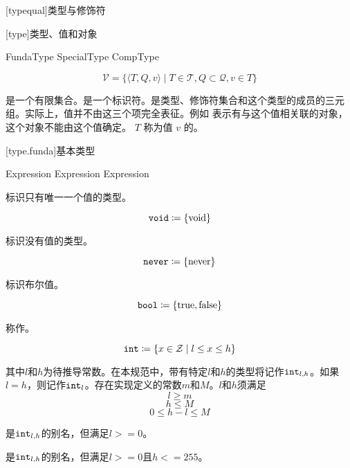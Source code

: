 
[typequal]{类型与修饰符}

[type]{类型、值和对象}

\begin{bnf}
 \br
    FundaType \br
    SpecialType \br
    CompType
\end{bnf}

$$ \mathcal{V} = \{ \langle T, Q, v \rangle \mid T \in \mathcal{T}, Q \subset \mathcal{Q}, v \in T \} $$

\pnum
{}是一个有限集合。是一个标识符。是类型、修饰符集合和这个类型的成员的三元组。\enternote 实际上，值并不由这三个项完全表征。例如  表示有与这个值相关联的对象，这个对象不能由这个值确定。 \exitnote $T$ 称为值 $v$ 的。

[type.funda]{基本类型}

\begin{bnf}
 \br
     \br
     \br
     \br
     \br
     \br
     \terminal{<} Expression \terminal{,} Expression \terminal{>} \br
     \br
     \terminal{<} Expression \terminal{>} \br
\end{bnf}

\pnum
{}标识只有唯一一个值的类型。

$$\texttt{void} \coloneqq \{ \mathrm{void} \}$$

\pnum
{}标识没有值的类型。

$$\texttt{never} \coloneqq \{ \mathrm{never} \}$$

\pnum
{} 标识布尔值。

$$\texttt{bool} \coloneqq \{ \mathrm{true}, \mathrm{false} \}$$

\pnum
{} 称作。

$$\texttt{int} \coloneqq \{ x \in \mathcal{Z} \mid l \le x \le h \} $$

其中$l$和$h$为待推导常数。在本规范中，带有特定$l$和$h$的类型将记作$\texttt{int}_{l, h}$。如果$l = h$，则记作$\texttt{int}_l$。存在实现定义的常数$m$和$M$。$l$和$h$须满足
$$ l \ge m $$
$$ h \le M $$
$$ 0 \le h - l \le M $$

是$\texttt{int}_{l,h}$的别名，但满足$l>=0$。

是$\texttt{int}_{l,h}$的别名，但满足$l>=0$且$h<=255$。

